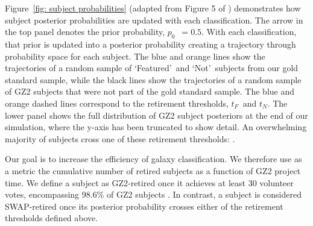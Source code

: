 \documentclass[twocolumn,  trackchanges, ]{aastex6}%
\newcommand{\p}{$p_0$}
\newcommand{\tf}{$t_F$}
\newcommand{\tn}{$t_N$}
\newcommand{\feat}{`Featured'}
\newcommand{\notfeat}{`Not'}
\begin{document}
Figure~\ref{fig: subject probabilities} (adapted from Figure 5 of \citealt{Marshall2016}) demonstrates how subject posterior probabilities are updated with each classification. The arrow in the top panel denotes the prior probability, \p~$=0.5$. With each classification, that prior is updated into a posterior probability creating a trajectory through probability space for each subject. The blue and orange lines show the trajectories of a random sample of \feat~and \notfeat~subjects from our gold standard sample, while the black lines show the trajectories of a random sample of GZ2 subjects that were not part of the gold standard  sample. The blue and orange dashed lines correspond to the retirement thresholds, \tf~and \tn. The lower panel shows the full distribution of GZ2 subject posteriors at the end of our simulation, where the y-axis has been truncated to show detail. An overwhelming majority of subjects cross one of these retirement thresholds: .

Our goal is to increase the efficiency of galaxy classification. We therefore  use as a metric the cumulative number of retired subjects as a function of GZ2 project time. We define a subject as GZ2-retired once it achieves at least 30 volunteer votes, encompassing 98.6\% of GZ2 subjects .  In contrast, a subject is considered SWAP-retired once its posterior probability crosses either of the retirement thresholds defined above. 
\end{document}
